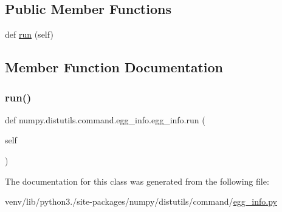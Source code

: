 \subsection*{Public Member Functions}
\begin{DoxyCompactItemize}
\item 
def \hyperlink{classnumpy_1_1distutils_1_1command_1_1egg__info_1_1egg__info_a4d2a9df6941729f9defda8b02e7ff92c}{run} (self)
\end{DoxyCompactItemize}


\subsection{Member Function Documentation}
\mbox{\label{classnumpy_1_1distutils_1_1command_1_1egg__info_1_1egg__info_a4d2a9df6941729f9defda8b02e7ff92c}} 
\subsubsection{\texorpdfstring{run()}{run()}}
{\footnotesize\ttfamily def numpy.\+distutils.\+command.\+egg\+\_\+info.\+egg\+\_\+info.\+run (\begin{DoxyParamCaption}\item[{}]{self }\end{DoxyParamCaption})}



The documentation for this class was generated from the following file\+:\begin{DoxyCompactItemize}
\item 
venv/lib/python3./site-\/packages/numpy/distutils/command/\hyperlink{numpy_2distutils_2command_2egg__info_8py}{egg\+\_\+info.\+py}\end{DoxyCompactItemize}
